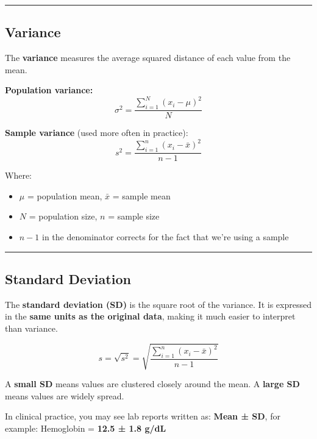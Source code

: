 \documentclass[
  12pt,
  letterpaper,
]{book}
\providecommand{\tightlist}{%
  \setlength{\itemsep}{0pt}\setlength{\parskip}{0pt}}
\begin{document}
\begin{center}\rule{0.5\linewidth}{0.5pt}\end{center}

\subsection{Variance}\label{variance}

The \textbf{variance} measures the average squared distance of each
value from the mean.

\textbf{Population variance:}
\[\sigma^2 = \frac{\sum_{i=1}^{N}(x_i - \mu)^2}{N}\]

\textbf{Sample variance} (used more often in practice):
\[s^2 = \frac{\sum_{i=1}^{n}(x_i - \bar{x})^2}{n-1}\]

Where:

\begin{itemize}
\tightlist
\item
  \(\mu\) = population mean, \(\bar{x}\) = sample mean
\item
  \(N\) = population size, \(n\) = sample size
\item
  \(n-1\) in the denominator corrects for the fact that we're using a
  sample
\end{itemize}

\begin{center}\rule{0.5\linewidth}{0.5pt}\end{center}

\subsection{Standard Deviation}\label{standard-deviation}

The \textbf{standard deviation (SD)} is the square root of the variance.
It is expressed in the \textbf{same units as the original data}, making
it much easier to interpret than variance.

\[s = \sqrt{s^2} = \sqrt{\frac{\sum_{i=1}^{n}(x_i - \bar{x})^2}{n-1}}\]

\begin{tcolorbox}[enhanced jigsaw, arc=.35mm, bottomrule=.15mm, bottomtitle=1mm, breakable, colback=white, colbacktitle=quarto-callout-tip-color!10!white, colframe=quarto-callout-tip-color-frame, coltitle=black, left=2mm, leftrule=.75mm, opacityback=0, opacitybacktitle=0.6, rightrule=.15mm, title={💡 Interpreting Standard Deviation}, titlerule=0mm, toprule=.15mm, toptitle=1mm]

A \textbf{small SD} means values are clustered closely around the mean.
A \textbf{large SD} means values are widely spread.

In clinical practice, you may see lab reports written as: \textbf{Mean ±
SD}, for example: Hemoglobin = \textbf{12.5 ± 1.8 g/dL}

\end{tcolorbox}
\end{document}
